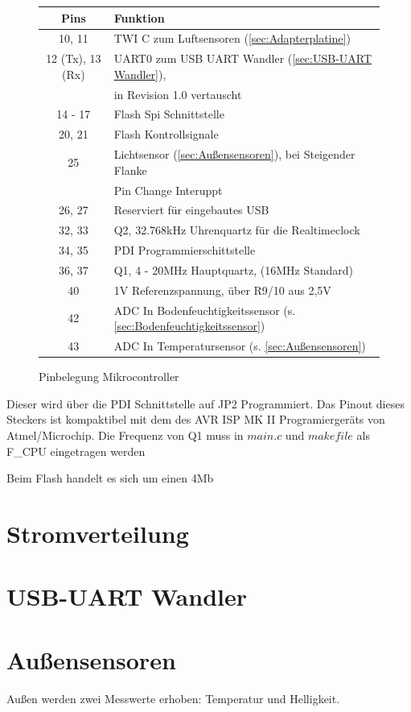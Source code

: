 \documentclass[12pt, a4paper, oneside]{report}
\begin{document}
\begin{figure}[h]
	\centering
\begin{tabular}{c|l}
	Pins & Funktion\\
	\hline
	10, 11 & TWI C zum Luftsensoren (\autoref{sec:Adapterplatine})\\
	12 (Tx), 13 (Rx)& UART0 zum USB UART Wandler (\autoref{sec:USB-UART Wandler}), \\&in Revision 1.0 vertauscht\\
	14 - 17 & Flash Spi Schnittstelle\\
	20, 21 & Flash Kontrollsignale\\
	25 & Lichtsensor (\autoref{sec:Außensensoren}), bei Steigender Flanke \\&Pin Change Interuppt\\
	26, 27 & Reserviert für eingebautes USB\\
	32, 33 & Q2, 32.768kHz Uhrenquartz für die Realtimeclock\\
	34, 35 & PDI Programmierschittstelle\\
	36, 37 & Q1, 4 - 20MHz Hauptquartz, (16MHz Standard)\\
	40 & 1V Referenzspannung, über R9/10 aus 2,5V\\
	42 & ADC In Bodenfeuchtigkeitssensor (s. \autoref{sec:Bodenfeuchtigkeitssensor}) \\
	43 & ADC In Temperatursensor (s. \autoref{sec:Außensensoren})\\
\end{tabular}
	\caption{Pinbelegung Mikrocontroller}
\end{figure}
Dieser wird über die PDI Schnittstelle auf JP2 Programmiert. Das Pinout dieses Steckers ist kompaktibel mit dem des AVR ISP MK II Programiergeräts von Atmel/Microchip.
Die Frequenz von Q1 muss in $main.c$ und $makefile$ als F\_CPU eingetragen werden

Beim Flash handelt es sich um einen 4Mb 

\section{Stromverteilung}
\label{sec:Stromverteilung}

\section{USB-UART Wandler}
\label{sec:USB-UART Wandler}

\pagebreak
\section{Außensensoren}
\label{sec:Außensensoren}
Außen werden zwei Messwerte erhoben: Temperatur und Helligkeit.
\end{document}
